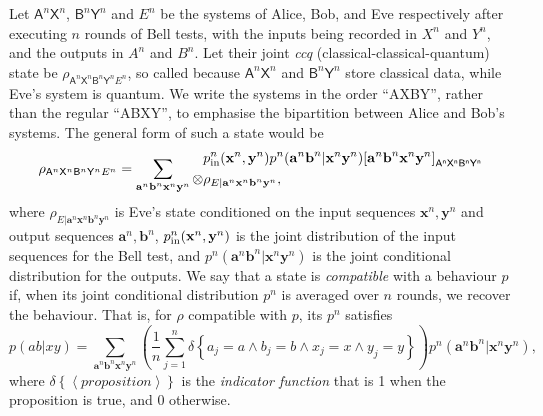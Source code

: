 \documentclass[10pt, a4paper]{article}
\numberwithin{equation}{section} %
\theoremstyle{definition}
\theoremstyle{plain}
\newcommand{\?}{\mathrel{?}} %
\newcommand{\cvec}[1]{\boldsymbol{\mathbf{#1}}}    %
\newcommand{\angleb}[1]{\left\langle #1 \right\rangle} %
\newcommand{\indic}[1]{\delta{\left\{#1\right\}}} %
\newcommand{\crv}[1]{\mathsf{#1}}
\newcommand{\proj}[2][]{{[#2]}_{#1}}
\begin{document}
    Let \(\crv{A}^{n}\crv{X}^{n}\), \(\crv{B}^{n}\crv{Y}^{n}\) and \(E^n\) be the systems of Alice, Bob, and Eve respectively after executing \(n\) rounds of Bell tests, with the inputs being recorded in \(X^{n}\) and \(Y^{n}\), and the outputs in \(A^{n}\) and \(B^{n}\). Let their joint \emph{ccq} (classical-classical-quantum) state be \(\rho_{\crv{A}^n\crv{X}^n \crv{B}^n\crv{Y}^n E^n}\), so called because \(\crv{A}^n\crv{X}^n\) and \(\crv{B}^n\crv{Y}^n\) store classical data, while Eve's system is quantum. We write the systems in the order ``AXBY'', rather than the regular ``ABXY'', to emphasise the bipartition between Alice and Bob's systems. The general form of such a state would be
      \begin{align}
        \rho_{\crv{A}^n\crv{X}^n \crv{B}^n\crv{Y}^n E^n} = \sum_{\cvec{a}^n\cvec{b}^n \cvec{x}^n\cvec{y}^n} \begin{aligned}[c]
          & p^n_{\rm in}(\cvec{x}^n,\cvec{y}^n) p^n(\cvec{a}^n\cvec{b}^n|\cvec{x}^n\cvec{y}^n) \proj[\crv{A^nX^nB^nY^n}]{\cvec{a}^n\cvec{b}^n\cvec{x}^n\cvec{y}^n} \\
          \otimes & \rho_{E|\cvec{a}^n\cvec{x}^n \cvec{b}^n\cvec{y}^n},
        \end{aligned}
      \end{align}
      where \(\rho_{E|\cvec{a}^n\cvec{x}^n \cvec{b}^n\cvec{y}^n}\) is Eve's state conditioned on the input sequences \(\cvec{x}^n, \cvec{y}^n\) and output sequences \(\cvec{a}^n, \cvec{b}^n\), \(p^n_{\rm in}(\cvec{x}^n, \cvec{y}^n)\) is the joint distribution of the input sequences for the Bell test, and \(p^n(\cvec{a}^n \cvec{b}^n|\cvec{x}^n \cvec{y}^n)\) is the joint conditional distribution for the outputs. We say that a state is \emph{compatible} with a behaviour \(p\) if, when its joint conditional distribution \(p^n\) is averaged over \(n\) rounds, we recover the behaviour. That is, for \(\rho\) compatible with \(p\), its \(p^n\) satisfies
      \begin{equation}
        p(ab|xy) = \sum_{\cvec{a}^n\cvec{b}^n \cvec{x}^n\cvec{y}^n} \left( \frac{1}{n} \sum_{j=1}^n \indic{a_j = a \land b_j = b \land x_j = x \land y_j = y} \right) p^n(\cvec{a}^n\cvec{b}^n|\cvec{x}^n\cvec{y}^n),
      \end{equation}
      where \(\indic{\angleb{proposition}}\) is the \emph{indicator function} that is 1 when the proposition is true, and 0 otherwise. 
\end{document}
